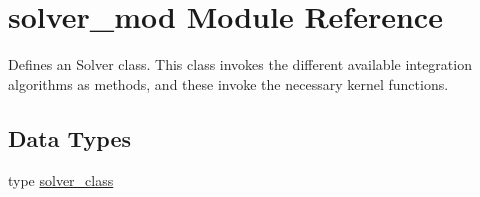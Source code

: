 \hypertarget{namespacesolver__mod}{}\section{solver\+\_\+mod Module Reference}
\label{namespacesolver__mod}


Defines an Solver class. This class invokes the different available integration algorithms as methods, and these invoke the necessary kernel functions.  


\subsection*{Data Types}
\begin{DoxyCompactItemize}
\item 
type \mbox{\hyperlink{structsolver__mod_1_1solver__class}{solver\+\_\+class}}
\end{DoxyCompactItemize}
